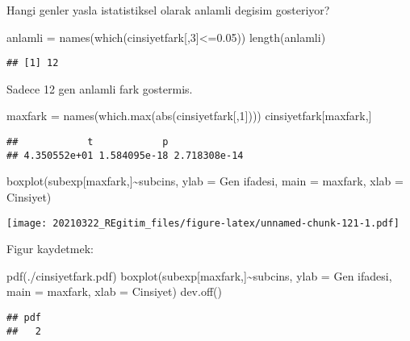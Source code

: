 \documentclass[
]{book}
\newenvironment{Shaded}{\begin{snugshade}}{\end{snugshade}}
\newcommand{\AttributeTok}[1]{\textcolor[rgb]{0.77,0.63,0.00}{#1}}
\newcommand{\DecValTok}[1]{\textcolor[rgb]{0.00,0.00,0.81}{#1}}
\newcommand{\FloatTok}[1]{\textcolor[rgb]{0.00,0.00,0.81}{#1}}
\newcommand{\FunctionTok}[1]{\textcolor[rgb]{0.00,0.00,0.00}{#1}}
\newcommand{\NormalTok}[1]{#1}
\newcommand{\OtherTok}[1]{\textcolor[rgb]{0.56,0.35,0.01}{#1}}
\newcommand{\SpecialCharTok}[1]{\textcolor[rgb]{0.00,0.00,0.00}{#1}}
\newcommand{\StringTok}[1]{\textcolor[rgb]{0.31,0.60,0.02}{#1}}
\begin{document}
Hangi genler yasla istatistiksel olarak anlamli degisim gosteriyor?

\begin{Shaded}
\begin{Highlighting}[]
\NormalTok{anlamli }\OtherTok{=} \FunctionTok{names}\NormalTok{(}\FunctionTok{which}\NormalTok{(cinsiyetfark[,}\DecValTok{3}\NormalTok{]}\SpecialCharTok{\textless{}=}\FloatTok{0.05}\NormalTok{))}
\FunctionTok{length}\NormalTok{(anlamli)}
\end{Highlighting}
\end{Shaded}

\begin{verbatim}
## [1] 12
\end{verbatim}

Sadece 12 gen anlamli fark gostermis.

\begin{Shaded}
\begin{Highlighting}[]
\NormalTok{maxfark }\OtherTok{=} \FunctionTok{names}\NormalTok{(}\FunctionTok{which.max}\NormalTok{(}\FunctionTok{abs}\NormalTok{(cinsiyetfark[,}\DecValTok{1}\NormalTok{])))}
\NormalTok{cinsiyetfark[maxfark,]}
\end{Highlighting}
\end{Shaded}

\begin{verbatim}
##            t            p              
## 4.350552e+01 1.584095e-18 2.718308e-14
\end{verbatim}

\begin{Shaded}
\begin{Highlighting}[]
\FunctionTok{boxplot}\NormalTok{(subexp[maxfark,]}\SpecialCharTok{\textasciitilde{}}\NormalTok{subcins, }\AttributeTok{ylab =} \StringTok{\textquotesingle{}Gen ifadesi\textquotesingle{}}\NormalTok{, }\AttributeTok{main =}\NormalTok{ maxfark, }
        \AttributeTok{xlab =} \StringTok{\textquotesingle{}Cinsiyet\textquotesingle{}}\NormalTok{)}
\end{Highlighting}
\end{Shaded}

\texttt{[image: 20210322\_REgitim\_files/figure-latex/unnamed-chunk-121-1.pdf]}

Figur kaydetmek:

\begin{Shaded}
\begin{Highlighting}[]
\FunctionTok{pdf}\NormalTok{(}\StringTok{\textquotesingle{}./cinsiyetfark.pdf\textquotesingle{}}\NormalTok{)}
\FunctionTok{boxplot}\NormalTok{(subexp[maxfark,]}\SpecialCharTok{\textasciitilde{}}\NormalTok{subcins, }\AttributeTok{ylab =} \StringTok{\textquotesingle{}Gen ifadesi\textquotesingle{}}\NormalTok{, }\AttributeTok{main =}\NormalTok{ maxfark, }
        \AttributeTok{xlab =} \StringTok{\textquotesingle{}Cinsiyet\textquotesingle{}}\NormalTok{)}
\FunctionTok{dev.off}\NormalTok{()}
\end{Highlighting}
\end{Shaded}

\begin{verbatim}
## pdf 
##   2
\end{verbatim}

  
\end{document}

